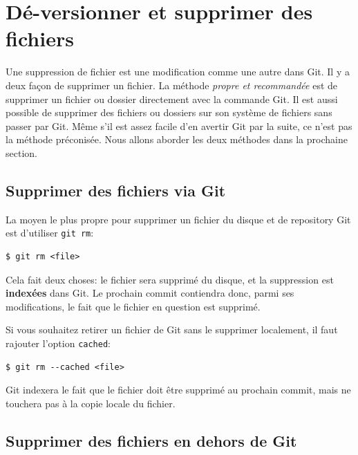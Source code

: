 \documentclass{../../common/tufte-latex/tufte-handout}
\begin{document}
\section{Dé-versionner et supprimer des fichiers}

Une suppression de fichier est une modification comme une autre dans Git.
Il y a deux façon de supprimer un fichier.
La méthode \textit{propre et recommandée} est de supprimer un fichier ou dossier directement avec la commande Git.
Il est aussi possible de supprimer des fichiers ou dossiers sur son système de fichiers sans passer par Git.
Même s'il est assez facile d'en avertir Git par la suite, ce n'est pas la méthode préconisée.
Nous allons aborder les deux méthodes dans la prochaine section.

\subsection{Supprimer des fichiers via Git}

La moyen le plus propre pour supprimer un fichier du disque et de repository Git est d'utiliser \texttt{git rm}:

\begin{lstlisting}[style=BashInputStyle]
  $ git rm <file>
\end{lstlisting}

Cela fait deux choses: le fichier sera supprimé du disque, et la suppression est \textbf{indexées} dans Git.
Le prochain commit contiendra donc, parmi ses modifications, le fait que le fichier en question est supprimé.

Si vous souhaitez retirer un fichier de Git sans le supprimer localement, il faut rajouter l'option \texttt{cached}:

\begin{lstlisting}[style=BashInputStyle]
  $ git rm --cached <file>
\end{lstlisting}

Git indexera le fait que le fichier doit être supprimé au prochain commit, mais ne touchera pas à la copie locale du fichier.

\subsection{Supprimer des fichiers en dehors de Git}
\end{document}
